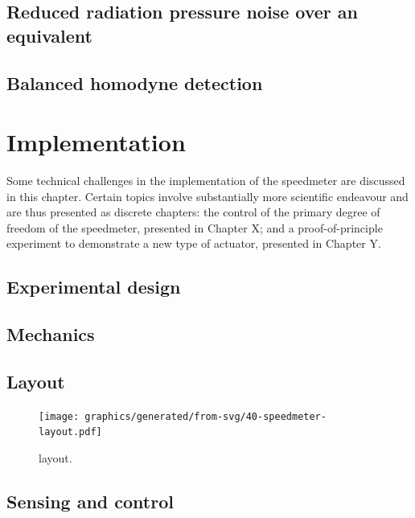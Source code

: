 \subsection{Reduced radiation pressure noise over an equivalent \MI{}}

\subsection{\label{sec:bhd-intro}Balanced homodyne detection}

\section{Implementation}

Some technical challenges in the implementation of the speedmeter are discussed in this chapter. Certain topics involve substantially more scientific endeavour and are thus presented as discrete chapters: the control of the primary degree of freedom of the speedmeter, presented in Chapter X; and a proof-of-principle experiment to demonstrate a new type of actuator, presented in Chapter Y.

\subsection{Experimental design}

\subsection{Mechanics}

\subsection{Layout}

\begin{figure}
  \centering
  \texttt{[image: graphics/generated/from-svg/40-speedmeter-layout.pdf]}
  \caption[\SSMEXPT{} layout]{\label{fig:ssm-layout}\SSMEXPT{} layout.}
\end{figure}

\subsection{Sensing and control}

